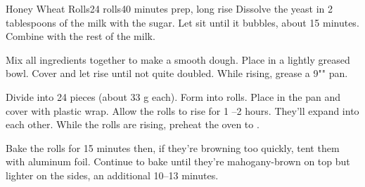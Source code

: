 \documentclass[../Cookbook.tex]{subfiles}
\begin{document}
\begin{recipe}[HoneyWheatRolls]{Honey Wheat Rolls}{24 rolls}{40 minutes prep, long rise}
	Dissolve the yeast in 2 tablespoons of the milk with the sugar. Let sit until it bubbles, about 15 minutes.
	Combine with the rest of the milk.

	Mix all ingredients together to make a smooth dough.
	Place in a lightly greased bowl.
	Cover and let rise until not quite doubled.
	While rising, grease a 9"" pan.

	Divide into 24 pieces (about 33 g each).
	Form into rolls. Place in the pan and cover with plastic wrap. Allow the rolls to rise for 1 --2 hours. They'll expand into each other.
	While the rolls are rising, preheat the oven to .

	Bake the rolls for 15 minutes then, if they're browning too quickly, tent them with aluminum foil.
	Continue to bake until they're mahogany-brown on top but lighter on the sides, an additional 10--13 minutes.
\end{recipe}
\end{document}
